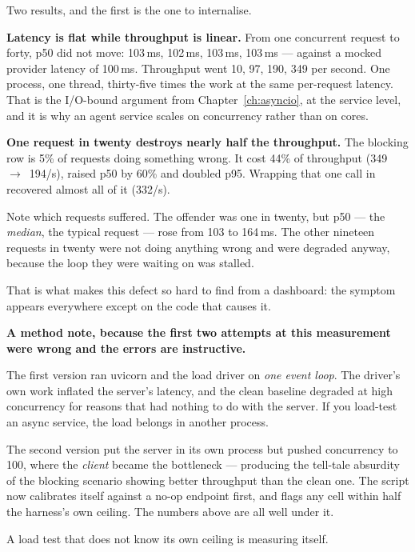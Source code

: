 Two results, and the first is the one to internalise.

\textbf{Latency is flat while throughput is linear.} From one concurrent request
to forty, p50 did not move: 103\,ms, 102\,ms, 103\,ms, 103\,ms --- against a
mocked provider latency of 100\,ms. Throughput went 10, 97, 190, 349 per second.
One process, one thread, thirty-five times the work at the same per-request
latency. That is the I/O-bound argument from Chapter~\ref{ch:asyncio}, at the
service level, and it is why an agent service scales on concurrency rather than
on cores.

\textbf{One request in twenty destroys nearly half the throughput.} The blocking
row is 5\% of requests doing something wrong. It cost 44\% of throughput
(349~$\rightarrow$~194/s), raised p50 by 60\% and doubled p95. Wrapping that one
call in  recovered almost all of it (332/s).

\begin{warning}
Note which requests suffered. The offender was one in twenty, but p50 --- the
\emph{median}, the typical request --- rose from 103 to 164\,ms. The other
nineteen requests in twenty were not doing anything wrong and were degraded
anyway, because the loop they were waiting on was stalled.

That is what makes this defect so hard to find from a dashboard: the symptom
appears everywhere except on the code that causes it.
\end{warning}

\begin{note}
\textbf{A method note, because the first two attempts at this measurement were
wrong and the errors are instructive.}

The first version ran uvicorn and the load driver on \emph{one event loop}. The
driver's own work inflated the server's latency, and the clean baseline degraded
at high concurrency for reasons that had nothing to do with the server. If you
load-test an async service, the load belongs in another process.

The second version put the server in its own process but pushed concurrency to
100, where the \emph{client} became the bottleneck --- producing the tell-tale
absurdity of the blocking scenario showing better throughput than the clean one.
The script now calibrates itself against a no-op endpoint first, and flags any
cell within half the harness's own ceiling. The numbers above are all well under
it.

A load test that does not know its own ceiling is measuring itself.
\end{note}

